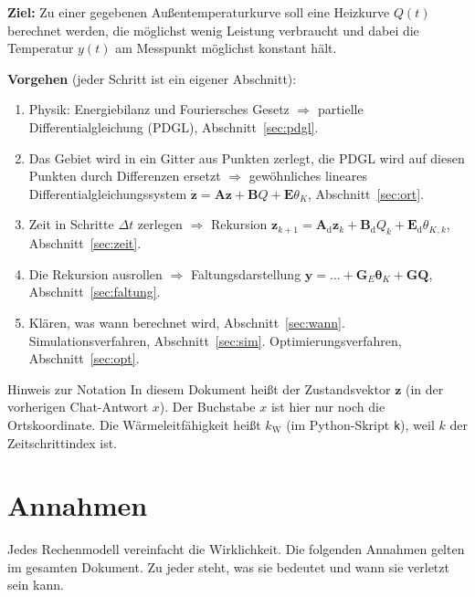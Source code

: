 \documentclass[11pt,a4paper]{article}
\numberwithin{equation}{section}
\newcommand{\dt}{\Delta t}
\newcommand{\kW}{k_{\mathrm W}}
\newcommand{\thK}{\theta_{K}}
\newcommand{\vthK}{\symbf{\theta}_{K}}
\newcommand{\mA}{\mathbf{A}}
\newcommand{\mB}{\mathbf{B}}
\newcommand{\mE}{\mathbf{E}}
\newcommand{\mG}{\mathbf{G}}
\newcommand{\mGE}{\mathbf{G}_{E}}
\newcommand{\mAd}{\mathbf{A}_{\mathrm d}}
\newcommand{\mBd}{\mathbf{B}_{\mathrm d}}
\newcommand{\mEd}{\mathbf{E}_{\mathrm d}}
\newcommand{\vz}{\mathbf{z}}
\newcommand{\vy}{\mathbf{y}}
\newcommand{\vQ}{\mathbf{Q}}
\begin{document}
\textbf{Ziel:} Zu einer gegebenen Außentemperaturkurve soll eine Heizkurve $Q(t)$ berechnet werden, die möglichst wenig Leistung verbraucht und dabei die Temperatur $y(t)$ am Messpunkt möglichst konstant hält.

\textbf{Vorgehen} (jeder Schritt ist ein eigener Abschnitt):
\begin{enumerate}
 \item Physik: Energiebilanz und Fouriersches Gesetz $\Rightarrow$ partielle Differentialgleichung (PDGL), Abschnitt~\ref{sec:pdgl}.
 \item Das Gebiet wird in ein Gitter aus Punkten zerlegt, die PDGL wird auf diesen Punkten durch Differenzen ersetzt $\Rightarrow$ gewöhnliches lineares Differentialgleichungssystem $\dot{\vz}=\mA\vz+\mB Q+\mE\thK$, Abschnitt~\ref{sec:ort}.
 \item Zeit in Schritte $\dt$ zerlegen $\Rightarrow$ Rekursion $\vz_{k+1}=\mAd\vz_k+\mBd Q_k+\mEd\thK{}_{,k}$, Abschnitt~\ref{sec:zeit}.
 \item Die Rekursion ausrollen $\Rightarrow$ Faltungsdarstellung $\vy=\dots+\mGE\vthK+\mG\vQ$, Abschnitt~\ref{sec:faltung}.
 \item Klären, was wann berechnet wird, Abschnitt~\ref{sec:wann}. Simulationsverfahren, Abschnitt~\ref{sec:sim}. Optimierungsverfahren, Abschnitt~\ref{sec:opt}.
\end{enumerate}

\begin{hinweis}{Hinweis zur Notation}
In diesem Dokument heißt der Zustandsvektor $\vz$ (in der vorherigen Chat-Antwort $x$). Der Buchstabe $x$ ist hier nur noch die Ortskoordinate. Die Wärmeleitfähigkeit heißt $\kW$ (im Python-Skript \texttt{k}), weil $k$ der Zeitschrittindex ist.
\end{hinweis}

\section{Annahmen}
\label{sec:annahmen}

Jedes Rechenmodell vereinfacht die Wirklichkeit. Die folgenden Annahmen gelten im gesamten Dokument. Zu jeder steht, was sie bedeutet und wann sie verletzt sein kann.
\end{document}
